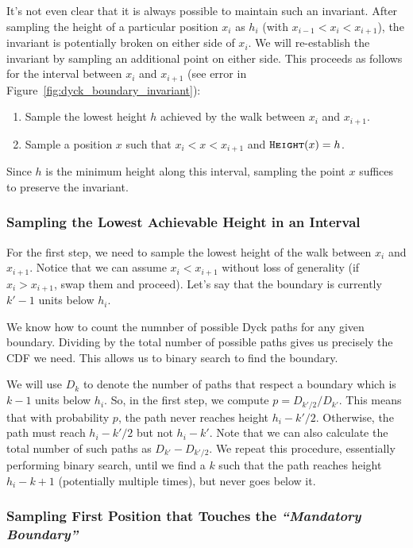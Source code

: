 It's not even clear that it is always possible to maintain such an invariant.
After sampling the height of a particular position $x_i$ as $h_i$ (with $x_{i-1} < x_i < x_{i+1}$),
the invariant is potentially broken on either side of $x_i$.
We will re-establish the invariant by sampling an additional point on either side.
This proceeds as follows for the interval between $x_i$ and $x_{i+1}$
(see error in Figure~\ref{fig:dyck_boundary_invariant}):
\begin{enumerate}
    \item Sample the lowest height $h$ achieved by the walk between $x_i$ and $x_{i+1}$.
    \item Sample a position $x$ such that $x_i < x < x_{i+1}$ and $\texttt{\textsc{Height}}(x) = h$.
\end{enumerate}
Since $h$ is the minimum height along this interval, sampling the point $x$ suffices to preserve the invariant.


\subsubsection{Sampling the Lowest Achievable Height in an Interval}%
\label{sec:sampling_the_lowest_achievable_height}
For the first step, we need to sample the lowest height of the walk between $x_i$ and $x_{i+1}$.
Notice that we can assume $x_i < x_{i+1}$ without loss of generality (if $x_i > x_{i+1}$, swap them and proceed).
Let's say that the boundary is currently $k'-1$ units below $h_i$.

We know how to count the numnber of possible Dyck paths for any given boundary.
Dividing by the total number of possible paths gives us precisely the CDF we need.
This allows us to binary search to find the boundary.

We will use $D_{k}$ to denote the number of paths that respect a boundary which is $k-1$ units below $h_i$.
So, in the first step, we compute $p = D_{k'/2}/D_{k'}$.
This means that with probability $p$, the path never reaches height $h_i - k'/2$.
Otherwise, the path must reach $h_i-k'/2$ but not $h_i-k'$.
Note that we can also calculate the total number of such paths as $D_{k'} - D_{k'/2}$.
We repeat this procedure, essentially performing binary search,
until we find a $k$ such that the path reaches height $h_i-k+1$ (potentially multiple times), but never goes below it.



\subsubsection{Sampling First Position that Touches the \emph{``Mandatory Boundary''}}%
\label{sec:sampling_first_position_touching_mandatory_boundary}

